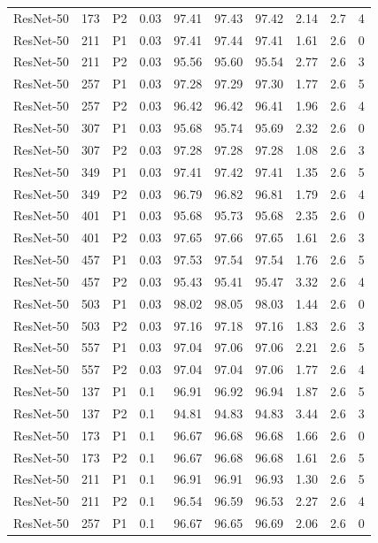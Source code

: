 {\begin{longtable}{lrllrrrrrr}
ResNet-50 & 173 & P2 & 0.03 & 97.41 & 97.43 & 97.42 & 2.14 & 2.7 & 4 \\
ResNet-50 & 211 & P1 & 0.03 & 97.41 & 97.44 & 97.41 & 1.61 & 2.6 & 0 \\
ResNet-50 & 211 & P2 & 0.03 & 95.56 & 95.60 & 95.54 & 2.77 & 2.6 & 3 \\
ResNet-50 & 257 & P1 & 0.03 & 97.28 & 97.29 & 97.30 & 1.77 & 2.6 & 5 \\
ResNet-50 & 257 & P2 & 0.03 & 96.42 & 96.42 & 96.41 & 1.96 & 2.6 & 4 \\
ResNet-50 & 307 & P1 & 0.03 & 95.68 & 95.74 & 95.69 & 2.32 & 2.6 & 0 \\
ResNet-50 & 307 & P2 & 0.03 & 97.28 & 97.28 & 97.28 & 1.08 & 2.6 & 3 \\
ResNet-50 & 349 & P1 & 0.03 & 97.41 & 97.42 & 97.41 & 1.35 & 2.6 & 5 \\
ResNet-50 & 349 & P2 & 0.03 & 96.79 & 96.82 & 96.81 & 1.79 & 2.6 & 4 \\
ResNet-50 & 401 & P1 & 0.03 & 95.68 & 95.73 & 95.68 & 2.35 & 2.6 & 0 \\
ResNet-50 & 401 & P2 & 0.03 & 97.65 & 97.66 & 97.65 & 1.61 & 2.6 & 3 \\
ResNet-50 & 457 & P1 & 0.03 & 97.53 & 97.54 & 97.54 & 1.76 & 2.6 & 5 \\
ResNet-50 & 457 & P2 & 0.03 & 95.43 & 95.41 & 95.47 & 3.32 & 2.6 & 4 \\
ResNet-50 & 503 & P1 & 0.03 & 98.02 & 98.05 & 98.03 & 1.44 & 2.6 & 0 \\
ResNet-50 & 503 & P2 & 0.03 & 97.16 & 97.18 & 97.16 & 1.83 & 2.6 & 3 \\
ResNet-50 & 557 & P1 & 0.03 & 97.04 & 97.06 & 97.06 & 2.21 & 2.6 & 5 \\
ResNet-50 & 557 & P2 & 0.03 & 97.04 & 97.04 & 97.06 & 1.77 & 2.6 & 4 \\
ResNet-50 & 137 & P1 & 0.1 & 96.91 & 96.92 & 96.94 & 1.87 & 2.6 & 5 \\
ResNet-50 & 137 & P2 & 0.1 & 94.81 & 94.83 & 94.83 & 3.44 & 2.6 & 3 \\
ResNet-50 & 173 & P1 & 0.1 & 96.67 & 96.68 & 96.68 & 1.66 & 2.6 & 0 \\
ResNet-50 & 173 & P2 & 0.1 & 96.67 & 96.68 & 96.68 & 1.61 & 2.6 & 5 \\
ResNet-50 & 211 & P1 & 0.1 & 96.91 & 96.91 & 96.93 & 1.30 & 2.6 & 5 \\
ResNet-50 & 211 & P2 & 0.1 & 96.54 & 96.59 & 96.53 & 2.27 & 2.6 & 4 \\
ResNet-50 & 257 & P1 & 0.1 & 96.67 & 96.65 & 96.69 & 2.06 & 2.6 & 0 \\

\end{longtable}}
